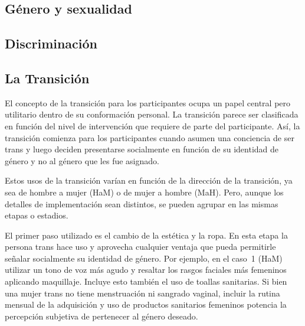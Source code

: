 \subsection{Género y sexualidad}
%
%
%
\subsection{Discriminación}
%
%
%
%
\subsection{La Transición}\label{ssec:transicion}

El concepto de la transición para los participantes ocupa un papel central pero
utilitario dentro de su conformación personal. La transición parece ser
clasificada en función del nivel de intervención que requiere de parte del
participante. Así, la transición comienza para los participantes cuando asumen
una conciencia de ser trans y luego deciden presentarse socialmente en función
de su identidad de género y no al género que les fue asignado.

Estos usos de la transición varían en función de la dirección de la transición,
ya sea de hombre a mujer (HaM) o de mujer a hombre (MaH). Pero, aunque los
detalles de implementación sean distintos, se pueden agrupar en las mismas
etapas o estadios.

El primer paso utilizado es el cambio de la estética y la ropa. En esta etapa la
persona trans hace uso y aprovecha cualquier ventaja que pueda permitirle
señalar socialmente su identidad de género. Por ejemplo, en el caso~1 (HaM)
utilizar un tono de voz más agudo y resaltar los rasgos faciales más femeninos
aplicando maquillaje. Incluye esto también el uso de toallas sanitarias. Si bien
una mujer trans no tiene menstruación ni sangrado vaginal, incluir la rutina
mensual de la adquisición y uso de productos sanitarios femeninos potencia la
percepción subjetiva de pertenecer al género deseado.

